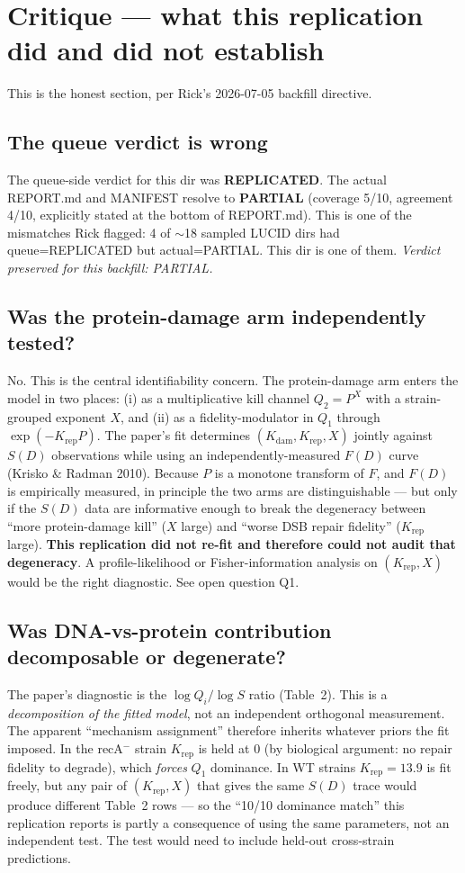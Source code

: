\documentclass[11pt]{article}
\begin{document}
\section{Critique --- what this replication did and did not establish}\label{sec:critique}

This is the honest section, per Rick's 2026-07-05 backfill directive.

\subsection*{The queue verdict is wrong}
The queue-side verdict for this dir was \textbf{REPLICATED}. The actual REPORT.md and MANIFEST
resolve to \textbf{PARTIAL} (coverage 5/10, agreement 4/10, explicitly stated at the bottom
of REPORT.md). This is one of the mismatches Rick flagged: 4 of $\sim$18 sampled LUCID dirs had
queue=REPLICATED but actual=PARTIAL. This dir is one of them. \emph{Verdict preserved for this
backfill: PARTIAL.}

\subsection*{Was the protein-damage arm independently tested?}
No. This is the central identifiability concern. The protein-damage arm enters the model in two
places: (i) as a multiplicative kill channel $Q_2 = P^X$ with a strain-grouped exponent $X$,
and (ii) as a fidelity-modulator in $Q_1$ through $\exp(-K_{\text{rep}} P)$. The paper's fit
determines $(K_{\text{dam}}, K_{\text{rep}}, X)$ jointly against $S(D)$ observations while
using an independently-measured $F(D)$ curve (Krisko \& Radman 2010). Because $P$ is a monotone
transform of $F$, and $F(D)$ is empirically measured, in principle the two arms are
distinguishable --- but only if the $S(D)$ data are informative enough to break the degeneracy
between ``more protein-damage kill'' ($X$ large) and ``worse DSB repair fidelity''
($K_{\text{rep}}$ large). \textbf{This replication did not re-fit and therefore could not
audit that degeneracy}. A profile-likelihood or Fisher-information analysis on
$(K_{\text{rep}}, X)$ would be the right diagnostic. See open question Q1.

\subsection*{Was DNA-vs-protein contribution decomposable or degenerate?}
The paper's diagnostic is the $\log Q_i / \log S$ ratio (Table~2). This is a
\emph{decomposition of the fitted model}, not an independent orthogonal measurement. The
apparent ``mechanism assignment'' therefore inherits whatever priors the fit imposed. In the
recA$^-$ strain $K_{\text{rep}}$ is held at 0 (by biological argument: no repair fidelity to
degrade), which \emph{forces} $Q_1$ dominance. In WT strains $K_{\text{rep}} = 13.9$ is fit
freely, but any pair of $(K_{\text{rep}}, X)$ that gives the same $S(D)$ trace would produce
different Table~2 rows --- so the ``10/10 dominance match'' this replication reports is
partly a consequence of using the same parameters, not an independent test. The test would
need to include held-out cross-strain predictions.
\end{document}
